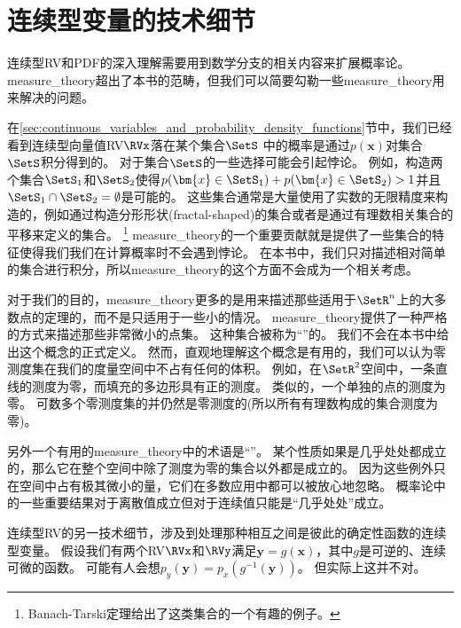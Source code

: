 \section{连续型变量的技术细节}
\label{sec:technical_details_of_continuous_variables}

连续型\gls{RV}和\gls{PDF}的深入理解需要用到数学分支的相关内容来扩展概率论。
\gls{measure_theory}超出了本书的范畴，但我们可以简要勾勒一些\gls{measure_theory}用来解决的问题。

在\ref{sec:continuous_variables_and_probability_density_functions}节中，我们已经看到连续型向量值\gls{RV}$\RVx$落在某个集合$\SetS$ 中的概率是通过$p(\bm{x})$对集合$\SetS$积分得到的。
对于集合$\SetS$的一些选择可能会引起悖论。
例如，构造两个集合$\SetS_1$和$\SetS_2$使得$p(\bm{x}\in \SetS_1) + p(\bm{x}\in \SetS_2)>1$并且$\SetS_1 \cap \SetS_2 = \emptyset$是可能的。
这些集合通常是大量使用了实数的无限精度来构造的，例如通过构造分形形状(fractal-shaped)的集合或者是通过有理数相关集合的平移来定义的集合。
\footnote{Banach-Tarski定理给出了这类集合的一个有趣的例子。}
\gls{measure_theory}的一个重要贡献就是提供了一些集合的特征使得我们我们在计算概率时不会遇到悖论。
在本书中，我们只对描述相对简单的集合进行积分，所以\gls{measure_theory}的这个方面不会成为一个相关考虑。


对于我们的目的，\gls{measure_theory}更多的是用来描述那些适用于$\SetR^n$上的大多数点的定理的，而不是只适用于一些小的情况。
\gls{measure_theory}提供了一种严格的方式来描述那些非常微小的点集。
这种集合被称为``''的。
我们不会在本书中给出这个概念的正式定义。
然而，直观地理解这个概念是有用的，我们可以认为零测度集在我们的度量空间中不占有任何的体积。
例如，在$\SetR^2$空间中，一条直线的测度为零，而填充的多边形具有正的测度。
类似的，一个单独的点的测度为零。
可数多个零测度集的并仍然是零测度的(所以所有有理数构成的集合测度为零)。

另外一个有用的\gls{measure_theory}中的术语是``''。
某个性质如果是几乎处处都成立的，那么它在整个空间中除了测度为零的集合以外都是成立的。
因为这些例外只在空间中占有极其微小的量，它们在多数应用中都可以被放心地忽略。
概率论中的一些重要结果对于离散值成立但对于连续值只能是``几乎处处''成立。

连续型\gls{RV}的另一技术细节，涉及到处理那种相互之间是彼此的确定性函数的连续型变量。
假设我们有两个\gls{RV}$\RVx$和$\RVy$满足$\bm{y} = g(\bm{x})$，其中$g$是可逆的、连续可微的函数。
可能有人会想$p_y(\bm{y}) = p_x(g^{-1}(\bm{y}))$。
但实际上这并不对。

